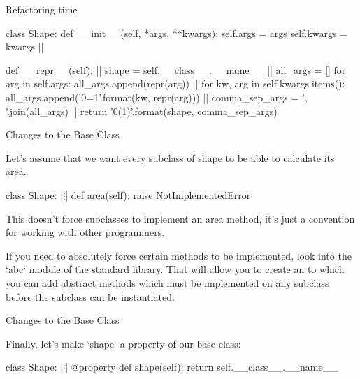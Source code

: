 \documentclass[aspectratio=149] {beamer}
\begin{document}
\begin{frame}[fragile]{Refactoring time}

\small
\begin{pythoncode}
  class Shape:
      def __init__(self, *args, **kwargs): 
          self.args = args
          self.kwargs = kwargs |\pause|

      def __repr__(self): |\pause|
          shape = self.__class__.__name__ |\pause|
          all_args = []
          for arg in self.args:
              all_args.append(repr(arg))  |\pause|
          for kw, arg in self.kwargs.items():
              all_args.append('{0}={1}'.format(kw, repr(arg)))  |\pause|
          comma_sep_args = ', '.join(all_args) |\pause|
          return '{0}({1})'.format(shape, comma_sep_args)
\end{pythoncode}


\end{frame}


\begin{frame}[fragile]{Changes to the Base Class}

  Let's assume that we want every subclass of shape to be able to calculate its area.

  \pause

  \begin{pythoncode}
    class Shape:
            |$\vdots$|
        def area(self):
            raise NotImplementedError
        
  \end{pythoncode}
  
  \medskip \pause
  
  This doesn't force subclasses to implement an area method, 
  it's just a convention for working with other programmers.
  
  \smallskip \pause
  
  If you need to absolutely force certain methods to be implemented, 
  look into the  \inline`abc` module of the standard library.
  That will allow you to create an  
  to which you can add abstract methods which must be implemented on 
  any subclass before the subclass can be instantiated. 


\end{frame}


\begin{frame}[fragile]{Changes to the Base Class}

Finally, let's make \inline`shape` a property of our base class:


  \begin{pythoncode}
    class Shape:
            |$\vdots$|
        @property
        def shape(self):
            return self.__class__.__name__

  \end{pythoncode}



\end{frame}
\end{document}
